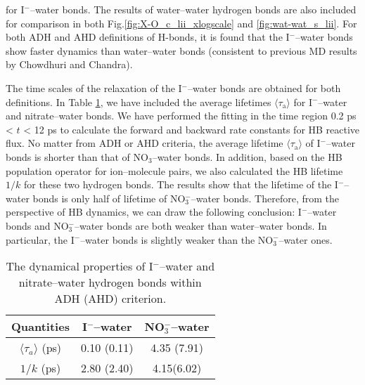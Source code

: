 for I$^-$--water bonds. The results of water--water hydrogen bonds are also included for comparison in both Fig.\thinspace\ref{fig:X-O_c_lii_xlogscale} 
and \thinspace\ref{fig:wat-wat_s_lii}.
For both ADH and AHD definitions of H-bonds, it is found that the I$^-$--water bonds show faster dynamics than water--water bonds 
(consistent to previous MD results by Chowdhuri and Chandra).\cite{Chowdhuri2006} 


The time scales of the relaxation of the I$^-$--water bonds are obtained for both definitions. 
In Table \ref{tab:properties_anion-water_hbs}, we have included the average lifetimes $\langle\tau_\text{a}\rangle$ for I$^-$--water and nitrate--water bonds. 
We have performed the fitting in the time region 0.2 ps < $t$ < 12 ps to calculate the forward and backward rate constants for HB reactive flux.
No matter from ADH or AHD criteria, the average lifetime $\langle\tau_\text{a}\rangle$ of I$^-$--water bonds is shorter than that of NO$_3$--water bonds.
In addition, based on the HB population operator for ion--molecule pairs, we also calculated the HB lifetime $1/k$ for these two hydrogen bonds. 
The results show that the lifetime of the I$^-$--water bonds is only half of lifetime of NO$_3^-$--water bonds. Therefore, from the perspective of HB dynamics,
we can draw the following conclusion: I$^-$--water bonds and NO$_3^-$--water bonds are both weaker than water--water bonds. In particular, 
the I$^-$--water bonds is slightly weaker than the NO$_3^-$--water ones.
\begin{table}[htbp]
\centering
\caption{ 
    The dynamical properties of I$^-$--water and nitrate--water hydrogen bonds within ADH (AHD) criterion.} 
\begin{tabular}{ccc}
\label{tab:properties_anion-water_hbs}
 Quantities  & I$^-$--water & NO$_3^-$--water \\
\hline
  $\langle\tau_a\rangle$ (ps) & 0.10 (0.11) & 4.35 (7.91) \\
  $1/k$ (ps) & 2.80 (2.40) & 4.15(6.02) \\
\end{tabular} %
\end{table}
